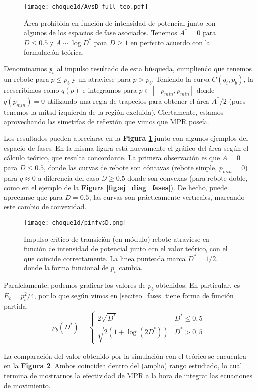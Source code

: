\begin{figure}[H]
	\centering
	\texttt{[image: choque1d/AvsD\_full\_teo.pdf]}
	\caption{Área prohibida en función de intensidad de potencial junto con algunos de los espacios de fase asociados.
		Tenemos $A^*=0$ para $D\leq 0.5$ y $A\sim \log{D^*}$ para $D\geq 1$ en perfecto acuerdo con la formulación teórica.}
	\label{fig:AvsD}
\end{figure}

Denominamos $p_b$ al impulso resultado de esta búsqueda, cumpliendo que tenemos un rebote para $p\leq p_b$ y un atraviese para $p>p_b$.
Teniendo la curva $C(q_i, p_b)$, la reescribimos como $q(p)$ e integramos para $p\in[-p_{min},p_{min}]$ donde $q(p_{min})=0$ utilizando una regla de trapecios para obtener el área $A^*/2$ (pues tenemos la mitad izquierda de la región excluida).
Ciertamente, estamos aprovechando las simetrías de reflexión que vimos que MPR poseía.

Los resultados pueden apreciarse en la \textbf{Figura \ref{fig:AvsD}} junto con algunos ejemplos del espacio de fases.
En la misma figura está nuevamente el gráfico del área según el cálculo teórico, que resulta concordante.
La primera observación es que $A=0$ para $D\leq 0.5$, donde las curvas de rebote son cóncavas (rebote simple, $p_{min}=0$) para $q\approx 0$ a diferencia del caso $D\geq 0.5$ donde son convexas
(para rebote doble, como en el ejemplo de la \textbf{Figura \ref{fig:ej_diag_fases}}).
De hecho, puede apreciarse que para $D=0.5$, las curvas son prácticamente verticales, marcando este cambio de convexidad.

\begin{figure}[H]
	\centering
	\texttt{[image: choque1d/pinfvsD.png]}
	\caption{Impulso crítico de transición (en módulo) rebote-atraviese en función de intensidad de potencial junto con el valor teórico, con el que coincide
	correctamente. La linea punteada marca $D^*=1/2$, donde la forma funcional de $p_b$ cambia.}
	\label{fig:pbvsD}
\end{figure}

Paralelamente, podemos graficar los valores de $p_b$ obtenidos.
En particular, es $E_c = p_b^2/4$, por lo que según vimos en \ref{sec:teo_fases} tiene forma de función partida.
\[p_b(D^*) =\left\{\begin{matrix}
2\sqrt{D^*} & D^*\leq 0,5 \\
\sqrt{2(1+\log(2D^*))} & D^*> 0,5
\end{matrix}\right.\]

La comparación del valor obtenido por la simulación con el teórico se encuentra en la \textbf{Figura \ref{fig:pbvsD}}.
Ambos coinciden dentro del (amplio) rango estudiado, lo cual termina de mostrarnos la efectividad de MPR a la hora de integrar las ecuaciones de movimiento.